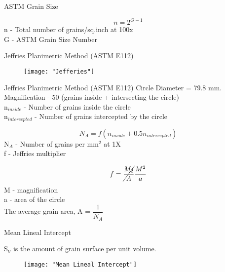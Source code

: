 \documentclass[10pt]{beamer}
\begin{document}
{%
\begin{frame}[fragile]{ASTM Grain Size}

\begin{equation*}
n = 2^{G-1}
\end{equation*}
n - Total number of grains/sq.inch at 100x \\
G - ASTM Grain Size Number    
\end{frame}
}

{%
\begin{frame}[fragile]{Jeffries Planimetric Method (ASTM E112)}

\begin{figure}[H]
\texttt{[image: "Jefferies"]}
\end{figure}
\end{frame}
}

{%
\begin{frame}[fragile]{Jeffries Planimetric Method (ASTM E112)}
Circle Diameter = 79.8 mm. \\
Magnification - 50 (grains inside + intersecting the circle) \\
n$ _{inside} $ - Number of grains inside the circle \\
n$_{intercepted}$ - Number of grains intercepted by the circle

\begin{equation*}
N_{A} = f(n_{inside} + 0.5n_{intercepted})  
\end{equation*}
N$_{A}$ - Number of grains per mm$^{2}$ at 1X \\ 
f - Jeffries multiplier

\begin{equation*}
f =\cancel{\dfrac{M_{2}}{A}}   \dfrac{M^{2}}{a}                                                  
\end{equation*}
M - magnification \\
a - area of the circle \\

The average grain area, A = $\dfrac{1}{N_{A}}$
   
\end{frame}
}

{%
\begin{frame}[fragile]{Mean Lineal Intercept}

S$ _{V} $ is the amount of grain surface per unit volume.

\begin{figure}[H]
\texttt{[image: "Mean Lineal Intercept"]}
\end{figure}
    
\end{frame}
}
\end{document}
